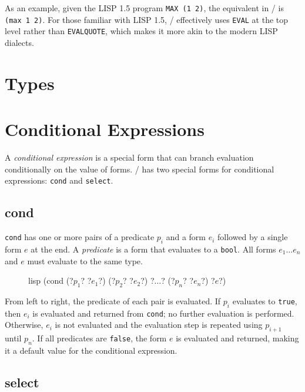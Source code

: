 \documentclass[a4paper, 12pt]{article}
\begin{document}
As an example, given the LISP 1.5 program \texttt{MAX (1 2)}, the equivalent in \lispy/ is \texttt{(max 1 2)}. For those familiar with LISP 1.5, \lispy/ effectively uses \texttt{EVAL} at the top level rather than \texttt{EVALQUOTE}, which makes it more akin to the modern LISP dialects.

\section{Types}


\section{Conditional Expressions}
A \textit{conditional expression} is a special form that can branch evaluation conditionally on the value of forms. \lispy/ has two special forms for conditional expressions: \texttt{cond} and \texttt{select}.

\subsection{cond}

\texttt{cond} has one or more pairs of a predicate $p_i$ and a form $e_i$ followed by a single form $e$ at the end. A \textit{predicate} is a form that evaluates to a \texttt{bool}. All forms $e_1 \ldots e_n$ and $e$ must evaluate to the same type.

\begin{figure}[htp]
    \centering
    \begin{cminted}[autogobble=true, escapeinside=??]{lisp}
        (cond (?$p_1$? ?$e_1$?) (?$p_2$? ?$e_2$?) ?$\ldots$? (?$p_n$? ?$e_n$?) ?$e$?)
    \end{cminted}
    \captionsetup[figure]{font=small}
\end{figure}

From left to right, the predicate of each pair is evaluated. If $p_i$ evaluates to \texttt{true}, then $e_i$ is evaluated and returned from \texttt{cond}; no further evaluation is performed. Otherwise, $e_i$ is not evaluated and the evaluation step is repeated using $p_{i + 1}$ until $p_n$. If all predicates are \texttt{false}, the form $e$ is evaluated and returned, making it a default value for the conditional expression.


\subsection{select}
\end{document}
